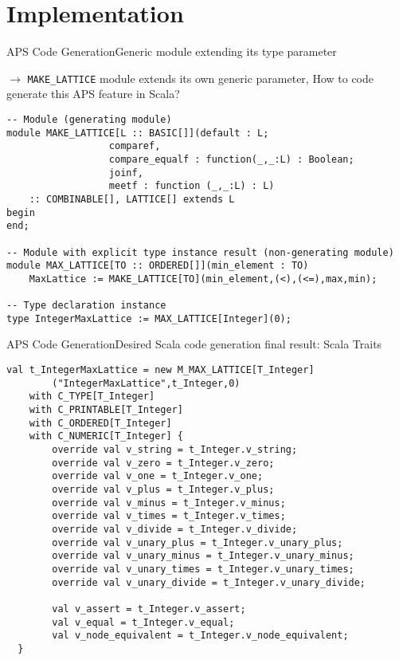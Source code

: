 \section{Implementation}

\begin{frame}[fragile=singleslide]{APS Code Generation}{Generic module extending its type parameter}

{ \small $\to$ \texttt{MAKE\_LATTICE} module \alert{extends its own generic parameter}, How to code generate this APS feature in \alert{Scala}? }

\newlinevspace

\begin{Verbatim}[fontsize=\tiny]
-- Module (generating module)
module MAKE_LATTICE[L :: BASIC[]](default : L;
				  comparef,
				  compare_equalf : function(_,_:L) : Boolean;
				  joinf,
				  meetf : function (_,_:L) : L)
    :: COMBINABLE[], LATTICE[] extends L
begin
end;

-- Module with explicit type instance result (non-generating module)
module MAX_LATTICE[TO :: ORDERED[]](min_element : TO)
    MaxLattice := MAKE_LATTICE[TO](min_element,(<),(<=),max,min);

-- Type declaration instance
type IntegerMaxLattice := MAX_LATTICE[Integer](0);
\end{Verbatim}

\end{frame}

\begin{frame}[fragile=singleslide]{APS Code Generation}{Desired Scala code generation final result: Scala Traits}


\begin{Verbatim}[fontsize=\tiny]
val t_IntegerMaxLattice = new M_MAX_LATTICE[T_Integer]
        ("IntegerMaxLattice",t_Integer,0)
    with C_TYPE[T_Integer]
    with C_PRINTABLE[T_Integer]
    with C_ORDERED[T_Integer]
    with C_NUMERIC[T_Integer] {
        override val v_string = t_Integer.v_string;
        override val v_zero = t_Integer.v_zero;
        override val v_one = t_Integer.v_one;
        override val v_plus = t_Integer.v_plus;
        override val v_minus = t_Integer.v_minus;
        override val v_times = t_Integer.v_times;
        override val v_divide = t_Integer.v_divide;
        override val v_unary_plus = t_Integer.v_unary_plus;
        override val v_unary_minus = t_Integer.v_unary_minus;
        override val v_unary_times = t_Integer.v_unary_times;
        override val v_unary_divide = t_Integer.v_unary_divide;
        
        val v_assert = t_Integer.v_assert;
        val v_equal = t_Integer.v_equal;
        val v_node_equivalent = t_Integer.v_node_equivalent;
  }
\end{Verbatim}

\end{frame}


